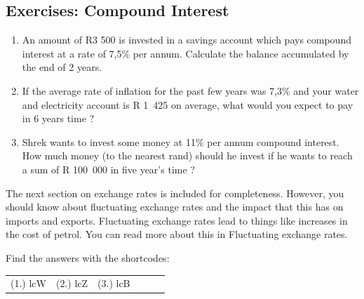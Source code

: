             \subsection{Exercises: Compound Interest }
            \nopagebreak
            \label{m39334*id75300}\begin{enumerate}[noitemsep, label=\textbf{\arabic*}. ] 
            \label{m39334*uid74}\item An amount of R3 500 is invested in a savings account which pays compound interest at a rate of 7,5\% per annum. Calculate the balance accumulated by the end of 2 years.\newline
\label{m39334*uid75}\item If the average rate of inflation for the past few years was 7,3\% and your water and electricity account is R 1~425 on average, what would you expect to pay in 6 years time ?\newline
\label{m39334*uid76}\item Shrek wants to invest some money at 11\% per annum compound interest. How much money (to the nearest rand) should he invest if he wants to reach a sum of R 100~000 in five year's time ?\newline
\end{enumerate}
  \label{m39334*eip-523}The next section on exchange rates is included for completeness. However, you should know about fluctuating exchange rates and the impact that this has on imports and exports. Fluctuating exchange rates lead to things like increases in the cost of petrol. You can read more about this in Fluctuating exchange rates.\par 
  \label{m39334**end}
\par {} Find the answers with the shortcodes:
 \par \begin{tabular}[h]{cccccc}
 (1.) lcW  &  (2.) lcZ  &  (3.) lcB  & \end{tabular}
